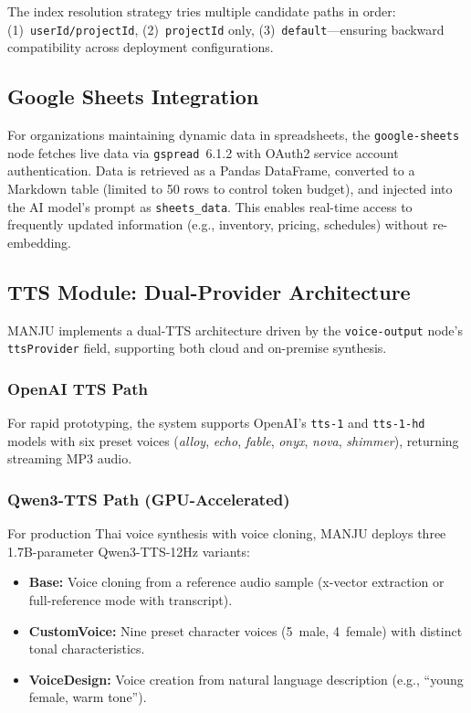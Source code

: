 \documentclass[10pt, a4paper, twocolumn]{article}
\begin{document}
\noindent The index resolution strategy tries multiple candidate paths in order: (1)~\texttt{userId/projectId}, (2)~\texttt{projectId} only, (3)~\texttt{default}---ensuring backward compatibility across deployment configurations.

\subsection{Google Sheets Integration}

For organizations maintaining dynamic data in spreadsheets, the \texttt{google-sheets} node fetches live data via \texttt{gspread}~6.1.2 with OAuth2 service account authentication.
Data is retrieved as a Pandas DataFrame, converted to a Markdown table (limited to 50 rows to control token budget), and injected into the AI model's prompt as \texttt{sheets\_data}.
This enables real-time access to frequently updated information (e.g., inventory, pricing, schedules) without re-embedding.

\subsection{TTS Module: Dual-Provider Architecture}
\label{sec:tts}

MANJU implements a dual-TTS architecture driven by the \texttt{voice-output} node's \texttt{ttsProvider} field, supporting both cloud and on-premise synthesis.

\subsubsection{OpenAI TTS Path}
For rapid prototyping, the system supports OpenAI's \texttt{tts-1} and \texttt{tts-1-hd} models with six preset voices (\textit{alloy}, \textit{echo}, \textit{fable}, \textit{onyx}, \textit{nova}, \textit{shimmer}), returning streaming MP3 audio.

\subsubsection{Qwen3-TTS Path (GPU-Accelerated)}
For production Thai voice synthesis with voice cloning, MANJU deploys three 1.7B-parameter Qwen3-TTS-12Hz variants:

\begin{itemize}[nosep]
    \item \textbf{Base:} Voice cloning from a reference audio sample (x-vector extraction or full-reference mode with transcript).
    \item \textbf{CustomVoice:} Nine preset character voices (5~male, 4~female) with distinct tonal characteristics.
    \item \textbf{VoiceDesign:} Voice creation from natural language description (e.g., ``young female, warm tone'').
\end{itemize}
\end{document}
